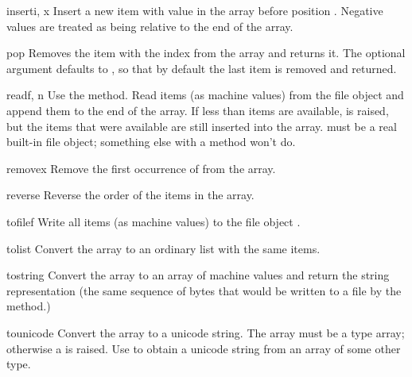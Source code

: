 \begin{methoddesc}[array]{insert}{i, x}
Insert a new item with value  in the array before position
. Negative values are treated as being relative to the end
of the array.
\end{methoddesc}

\begin{methoddesc}[array]{pop}{}
Removes the item with the index  from the array and returns
it. The optional argument defaults to , so that by default
the last item is removed and returned.
\end{methoddesc}

\begin{methoddesc}[array]{read}{f, n}
  {Use the  method.}
Read  items (as machine values) from the file object 
and append them to the end of the array.  If less than  items
are available,  is raised, but the items that were
available are still inserted into the array.   must be a real
built-in file object; something else with a  method won't
do.
\end{methoddesc}

\begin{methoddesc}[array]{remove}{x}
Remove the first occurrence of  from the array.
\end{methoddesc}

\begin{methoddesc}[array]{reverse}{}
Reverse the order of the items in the array.
\end{methoddesc}

\begin{methoddesc}[array]{tofile}{f}
Write all items (as machine values) to the file object .
\end{methoddesc}

\begin{methoddesc}[array]{tolist}{}
Convert the array to an ordinary list with the same items.
\end{methoddesc}

\begin{methoddesc}[array]{tostring}{}
Convert the array to an array of machine values and return the
string representation (the same sequence of bytes that would
be written to a file by the  method.)
\end{methoddesc}

\begin{methoddesc}[array]{tounicode}{}
Convert the array to a unicode string.  The array must be
a type  array; otherwise a  is raised.
Use  to obtain a unicode string
from an array of some other type.
\end{methoddesc}

